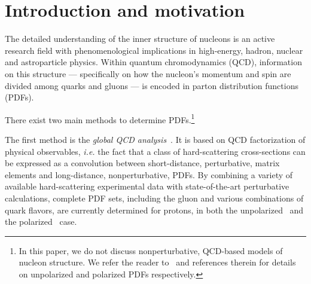 \section{Introduction and motivation}

The detailed understanding of the inner structure of nucleons is an 
active research field with phenomenological implications in 
high-energy, hadron, nuclear and astroparticle physics.
%
Within quantum chromodynamics (QCD), information on this structure ---
specifically on how the nucleon's momentum and spin are divided among quarks 
and gluons --- is encoded in parton distribution functions (PDFs).

There exist two main methods to determine PDFs.\footnote{In this paper, we do
not discuss nonperturbative, QCD-based models of nucleon structure. 
We refer the reader to~\cite{Ball:2016spl,Nocera:2014uea} and references 
therein for details on unpolarized and polarized PDFs respectively.}

The first method is the {\it global QCD analysis}~\cite{Perez:2012um,
DeRoeck:2011na,Alekhin:2011sk,Ball:2012wy,Forte:2013wc,Jimenez-Delgado:2013sma,
Rojo:2015acz,Butterworth:2015oua,Accardi:2016ndt,Gao:2017yyd}.
%
It is based on QCD factorization of physical observables, {\it i.e.}
the fact that a class of hard-scattering cross-sections can be expressed as a 
convolution between short-distance, perturbative, matrix 
elements and long-distance, nonperturbative, PDFs.
%
By combining a variety of available hard-scattering experimental data with 
state-of-the-art perturbative calculations, complete PDF sets, including 
the gluon and various combinations of quark flavors, are currently determined
for protons, in both the unpolarized~\cite{Ball:2017nwa,Harland-Lang:2014zoa,
Dulat:2015mca,Alekhin:2017kpj,Accardi:2016qay} and the
polarized~\cite{Nocera:2014gqa,deFlorian:2009vb,Sato:2016tuz,Hirai:2008aj} case.


